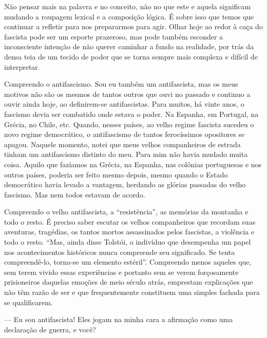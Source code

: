 Não pensar mais na palavra e no conceito, não no que este e aquela
significam mudando a roupagem lexical e a composição lógica. É sobre
isso que temos que continuar a refletir para nos prepararmos para agir.
Olhar hoje ao redor à caça do fascista pode ser um esporte prazeroso,
mas pode também esconder a inconsciente intenção de não querer caminhar
a fundo na realidade, por trás da densa teia de um tecido de poder que
se torna sempre mais complexa e difícil de interpretar.

Compreendo o antifascismo. Sou eu também um antifascista, mas os meus
motivos não são os mesmos de tantos outros que ouvi no passado e
continuo a ouvir ainda hoje, ao definirem-se antifascistas. Para muitos,
há vinte anos, o fascismo devia ser combatido onde estava o poder. Na
Espanha, em Portugal, na Grécia, no Chile, etc. Quando, nesses países,
ao velho regime fascista sucedeu o novo regime democrático, o
antifascismo de tantos ferocíssimos opositores se apagou. Naquele
momento, notei que meus velhos companheiros de estrada tinham um
antifascismo distinto do meu. Para mim não havia mudado muita coisa.
Aquilo que fazíamos na Grécia, na Espanha, nas colônias portuguesas e
nos outros países, poderia ser feito mesmo depois, mesmo quando o Estado
democrático havia levado a vantagem, herdando as glórias passadas do
velho fascismo. Mas nem todos estavam de acordo.

Compreendo o velho antifascista, a ``resistência'', as memórias da
montanha e todo o resto. É preciso saber escutar os velhos companheiros
que recordam suas aventuras, tragédias, os tantos mortos assassinados
pelos fascistas, a violência e todo o resto. ``Mas, ainda disse Tolstói,
o indivíduo que desempenha um papel nos acontecimentos históricos nunca
compreende seu significado. Se tenta compreendê-lo, torna-se um elemento
estéril''. Compreendo menos aqueles que, sem terem vivido essas
experiências e portanto sem se verem forçosamente prisioneiros daquelas
emoções de meio século atrás, emprestam explicações que não têm razão de
ser e que frequentemente constituem uma simples fachada para se
qualificarem.

--- Eu sou antifascista! Eles jogam na minha cara a afirmação como uma
declaração de guerra, e você?


